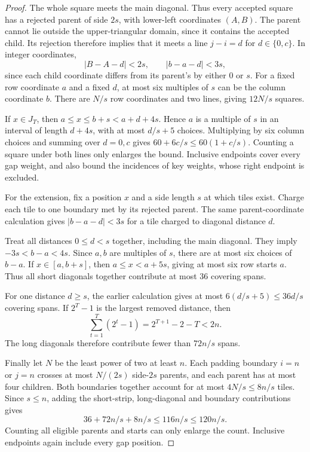\documentclass[11pt]{article}
\begin{document}
\begin{proof}
The whole square meets the main diagonal. Thus every accepted square has
a rejected parent of side $2s$, with lower-left coordinates $(A,B)$.
The parent cannot lie outside the upper-triangular domain, since it
contains the accepted child. Its rejection therefore implies that it
meets a line $j-i=d$ for $d\in\{0,c\}$. In integer coordinates,
\[
 |B-A-d|<2s,\qquad |b-a-d|<3s,
\]
since each child coordinate differs from its parent's by either $0$ or
$s$. For a fixed row coordinate $a$ and a fixed $d$, at most six
multiples of $s$ can be the column coordinate $b$. There are $N/s$
row coordinates and two lines, giving $12N/s$ squares.

If $x\in J_T$, then $a\le x\le b+s<a+d+4s$. Hence $a$ is a multiple
of $s$ in an interval of length $d+4s$, with at most $d/s+5$ choices.
Multiplying by six column choices and summing over $d=0,c$ gives
$60+6c/s\le60(1+c/s)$. Counting a square under both lines only enlarges
the bound. Inclusive endpoints cover every gap weight, and also bound
the incidences of key weights, whose right endpoint is excluded.

For the extension, fix a position $x$ and a side length $s$ at which tiles
exist. Charge each tile to one boundary met by its rejected parent.
The same parent-coordinate calculation gives $|b-a-d|<3s$ for a tile
charged to diagonal distance $d$.

Treat all distances $0\le d<s$ together, including the main diagonal.
They imply $-3s<b-a<4s$. Since $a,b$ are multiples of $s$, there are at
most six choices of $b-a$. If $x\in[a,b+s]$, then
$a\le x<a+5s$, giving at most six row starts $a$. Thus all short
diagonals together contribute at most $36$ covering spans.

For one distance $d\ge s$, the earlier calculation gives at most
$6(d/s+5)\le36d/s$ covering spans. If $2^T-1$ is the largest removed
distance, then
\[
 \sum_{t=1}^T(2^t-1)=2^{T+1}-2-T<2n.
\]
The long diagonals therefore contribute fewer than $72n/s$ spans.

Finally let $N$ be the least power of two at least $n$. Each padding
boundary $i=n$ or $j=n$ crosses at most $N/(2s)$ side-$2s$ parents,
and each parent has at most four children. Both boundaries together
account for at most $4N/s\le8n/s$ tiles. Since $s\le n$, adding the
short-strip, long-diagonal and boundary contributions gives
\[
 36+72n/s+8n/s\le116n/s\le120n/s.
\]
Counting all eligible parents and starts can only enlarge the count.
Inclusive endpoints again include every gap position.
\end{proof}
\end{document}
